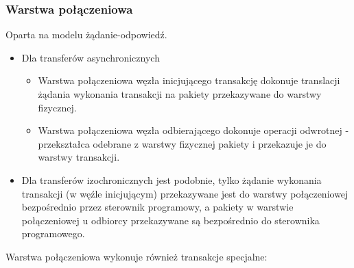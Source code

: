 	\subsubsection{Warstwa połączeniowa}
	Oparta na modelu żądanie-odpowiedź.
	\begin{itemize}
		\item Dla transferów asynchronicznych
		\begin{itemize}
			\item Warstwa połączeniowa węzła inicjującego transakcję dokonuje translacji żądania wykonania transakcji na pakiety przekazywane do warstwy fizycznej.
			\item Warstwa połączeniowa węzła odbierającego dokonuje operacji odwrotnej - przekształca odebrane z warstwy fizycznej pakiety i przekazuje je do warstwy transakcji.
		\end{itemize}
		\item Dla transferów izochronicznych jest podobnie, tylko żądanie wykonania transakcji (w węźle inicjującym) przekazywane jest do warstwy połączeniowej bezpośrednio przez sterownik programowy, a pakiety w warstwie połączeniowej u odbiorcy przekazywane są bezpośrednio do sterownika programowego.
	\end{itemize}
	Warstwa połączeniowa wykonuje również transakcje specjalne:
